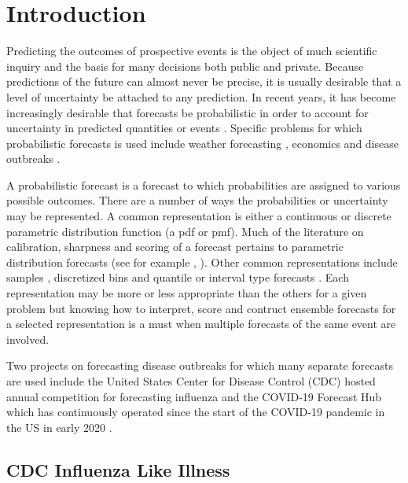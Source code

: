 \documentclass{article}\usepackage[]{graphicx}\usepackage[]{color}
\begin{document}
\section{Introduction}
Predicting the outcomes of prospective events is the object of much scientific
inquiry and the basis for many decisions both public and private. Because 
predictions of the future can almost never be precise, it is usually desirable
that a level of uncertainty be attached to any prediction. In recent years, it
has become increasingly desirable that forecasts be probabilistic in order to 
account for uncertainty in predicted quantities or events 
\cite{gneiting2014probabilistic}. Specific problems for 
which probabilistic forecasts is used include weather forecasting
\cite{baran2018combining}, economics \cite{groen2013real} and disease outbreaks
\cite{yamana2016superensemble}.

A probabilistic forecast is a forecast to which probabilities are assigned to 
various possible outcomes. There are a number of ways the probabilities or 
uncertainty may be represented. A common representation is either a continuous 
or
discrete parametric distribution function (a pdf or pmf). Much of the literature 
on calibration, sharpness and scoring of a forecast pertains to parametric 
distribution forecasts (see for example 
\cite{gneiting2007probabilistic},
\cite{gneiting2013combining} \cite{baran2018combining}).
Other common representations include samples \cite{krueger2016probabilistic}, 
discretized bins 
and quantile or interval type forecasts \cite{taylor2021evaluating} 
\cite{bracher2021evaluating}. Each representation may be more or less 
appropriate than the others for a given problem but knowing how to interpret, 
score and contruct ensemble forecasts for a selected representation is a must 
when multiple forecasts of the same event are involved.

Two projects on forecasting disease outbreaks for which many separate forecasts 
are used include the United States Center for Disease Control (CDC) hosted
annual competition for forecasting influenza \cite{cdcflusight}
and the COVID-19 Forecast Hub which has 
continuously operated since the start of the COVID-19 pandemic in the US in 
early 2020 \cite{Cramer2021-hub-dataset}.

\subsection{CDC Influenza Like Illness}
\end{document}
